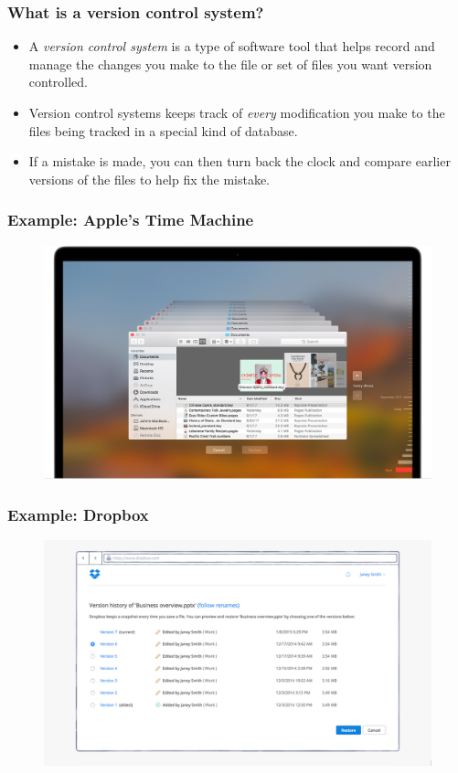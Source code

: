 \documentclass{beamer}
\begin{document}
\begin{frame}
   \frametitle{What is a version control system?}
   \begin{itemize}
      \setlength\itemsep{1.0em}
      \item A \textit{version control system} is a type of software 
         tool that helps record and manage the changes you make to the 
         file or set of files you want version controlled.
      \item Version control systems keeps track of \textit{every} 
         modification you make to the files being tracked in a special 
         kind of database.
      \item If a mistake is made, you can then turn back the clock and 
         compare earlier versions of the files to help fix the mistake. 
   \end{itemize}
\end{frame}

\begin{frame}
   \frametitle{Example: Apple's Time Machine}
   \begin{figure}[htbp]
      \includegraphics[width=1.0\textwidth]{images/macos-high-sierra-time-machine-documents.jpg}
   \end{figure}
\end{frame}

\begin{frame}
   \frametitle{Example: Dropbox}
   \begin{figure}[htbp]
      \includegraphics[width=1.0\textwidth]{images/dropbox_view_version_history.png}
   \end{figure}
\end{frame}
\end{document}
